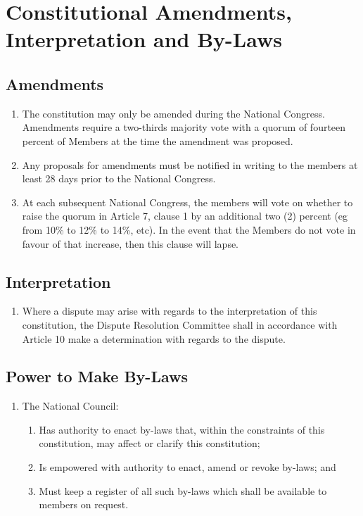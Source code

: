 \documentclass[a4paper,titlepage,8.5pt]{article}
\begin{document}
\section{Constitutional Amendments, Interpretation and By-Laws}

\subsection{Amendments}

\begin{enumerate}
\item The constitution may only be amended during the National Congress. Amendments require a two-thirds majority vote with a quorum of fourteen percent of Members at the time the amendment was proposed.
\item Any proposals for amendments must be notified in writing to the members at least 28 days prior to the National Congress.
\item At each subsequent National Congress, the members will vote on whether to raise the quorum in Article 7, clause 1 by an additional two (2) percent (eg from 10\% to 12\% to 14\%, etc). In the event that the Members do not vote in favour of that increase, then this clause will lapse.
\end{enumerate}

\subsection{Interpretation}

\begin{enumerate}
\item Where a dispute may arise with regards to the interpretation of this constitution, the Dispute Resolution Committee shall in accordance with Article 10 make a determination with regards to the dispute.
\end{enumerate}

\subsection{Power to Make By-Laws}

\begin{enumerate}
\item The National Council:
\begin{enumerate}
\item Has authority to enact by-laws that, within the constraints of this constitution, may affect or clarify this constitution;
\item Is empowered with authority to enact, amend or revoke by-laws; and
\item Must keep a register of all such by-laws which shall be available to members on request.
\end{enumerate}
\end{enumerate}
\end{document}
